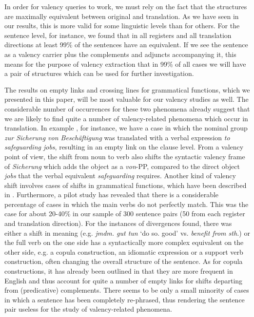 \documentclass[output=paper]{LSP/langsci}
\begin{document}
In order for valency queries to work, we must rely on the fact that the structures are maximally equivalent between original and translation. As we have seen in our results, this is more valid for some linguistic levels than for others. For the sentence level, for instance, we found that in all registers and all translation directions at least 99\% of the sentences have an equivalent. If we see the sentence as a valency carrier plus the complements and adjuncts accompanying it, this means for the purpose of valency extraction that in 99\% of all cases we will have a pair of structures which can be used for further investigation.


The results on empty links and crossing lines for grammatical functions, which we presented in this paper, will be most valuable for our valency studies as well. The considerable number of occurrences for these two phenomena already suggest that we are likely to find quite a number of valency-related phenomena which occur in translation. In example , for instance, we have a case in which the nominal group \textit{zur Sicherung von Beschäftigung} was translated with a verbal expression \textit{to safeguarding jobs}, resulting in an empty link on the clause level. From a valency point of view, the shift from noun to verb also shifts the syntactic valency frame of \textit{Sicherung} which adds the object as a \textit{von}{}-PP, compared to the direct object \textit{jobs} that the verbal equivalent \textit{safeguarding} requires. Another kind of valency shift involves cases of shifts in grammatical functions, which have been described in . Furthermore, a pilot study has revealed that there is a considerable percentage of cases in which the main verbs do not perfectly match. This was the case for about 20-40\% in our sample of 300 sentence pairs (50 from each register and translation direction). For the instances of divergences found, there was either a shift in meaning (e.g. \textit{jmdm. gut tun} `do so. good' vs. \textit{benefit from sth.}) or the full verb on the one side has a syntactically more complex equivalent on the other side, e.g. a copula construction, an idiomatic expression or a support verb construction, often changing the overall structure of the sentence. As for copula constructions, it has already been outlined in  that they are more frequent in English and thus account for quite a number of empty links for shifts departing from (predicative) complements. There seems to be only a small minority of cases in which a sentence has been completely re-phrased, thus rendering the sentence pair useless for the study of valency-related phenomena.
\end{document}
